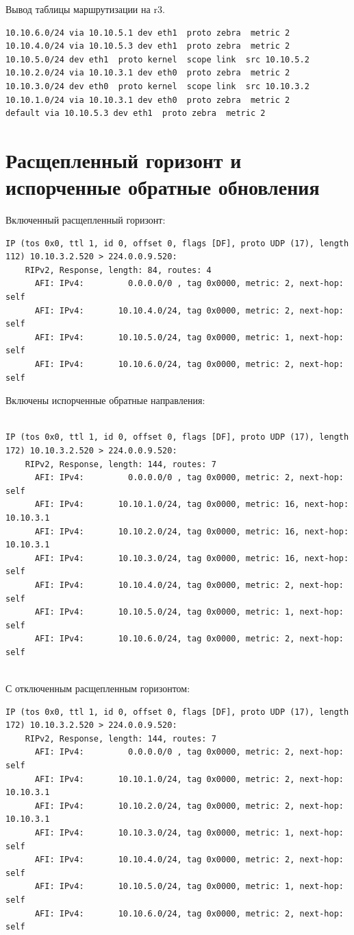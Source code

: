 \documentclass[a4paper,12pt]{article}
\begin{document}
Вывод таблицы маршрутизации на r3.

\begin{Verbatim}
10.10.6.0/24 via 10.10.5.1 dev eth1  proto zebra  metric 2 
10.10.4.0/24 via 10.10.5.3 dev eth1  proto zebra  metric 2 
10.10.5.0/24 dev eth1  proto kernel  scope link  src 10.10.5.2 
10.10.2.0/24 via 10.10.3.1 dev eth0  proto zebra  metric 2 
10.10.3.0/24 dev eth0  proto kernel  scope link  src 10.10.3.2 
10.10.1.0/24 via 10.10.3.1 dev eth0  proto zebra  metric 2 
default via 10.10.5.3 dev eth1  proto zebra  metric 2 
\end{Verbatim}

\section{Расщепленный горизонт и испорченные обратные обновления}

Включенный расщепленный горизонт:
\begin{Verbatim}
IP (tos 0x0, ttl 1, id 0, offset 0, flags [DF], proto UDP (17), length 112) 10.10.3.2.520 > 224.0.0.9.520: 
	RIPv2, Response, length: 84, routes: 4
	  AFI: IPv4:         0.0.0.0/0 , tag 0x0000, metric: 2, next-hop: self
	  AFI: IPv4:       10.10.4.0/24, tag 0x0000, metric: 2, next-hop: self
	  AFI: IPv4:       10.10.5.0/24, tag 0x0000, metric: 1, next-hop: self
	  AFI: IPv4:       10.10.6.0/24, tag 0x0000, metric: 2, next-hop: self
\end{Verbatim}


Включены испорченные обратные направления:
\begin{Verbatim}

IP (tos 0x0, ttl 1, id 0, offset 0, flags [DF], proto UDP (17), length 172) 10.10.3.2.520 > 224.0.0.9.520: 
	RIPv2, Response, length: 144, routes: 7
	  AFI: IPv4:         0.0.0.0/0 , tag 0x0000, metric: 2, next-hop: self
	  AFI: IPv4:       10.10.1.0/24, tag 0x0000, metric: 16, next-hop: 10.10.3.1
	  AFI: IPv4:       10.10.2.0/24, tag 0x0000, metric: 16, next-hop: 10.10.3.1
	  AFI: IPv4:       10.10.3.0/24, tag 0x0000, metric: 16, next-hop: self
	  AFI: IPv4:       10.10.4.0/24, tag 0x0000, metric: 2, next-hop: self
	  AFI: IPv4:       10.10.5.0/24, tag 0x0000, metric: 1, next-hop: self
	  AFI: IPv4:       10.10.6.0/24, tag 0x0000, metric: 2, next-hop: self
	  
\end{Verbatim}

С отключенным расщепленным горизонтом:
\begin{Verbatim}
IP (tos 0x0, ttl 1, id 0, offset 0, flags [DF], proto UDP (17), length 172) 10.10.3.2.520 > 224.0.0.9.520: 
	RIPv2, Response, length: 144, routes: 7
	  AFI: IPv4:         0.0.0.0/0 , tag 0x0000, metric: 2, next-hop: self
	  AFI: IPv4:       10.10.1.0/24, tag 0x0000, metric: 2, next-hop: 10.10.3.1
	  AFI: IPv4:       10.10.2.0/24, tag 0x0000, metric: 2, next-hop: 10.10.3.1
	  AFI: IPv4:       10.10.3.0/24, tag 0x0000, metric: 1, next-hop: self
	  AFI: IPv4:       10.10.4.0/24, tag 0x0000, metric: 2, next-hop: self
	  AFI: IPv4:       10.10.5.0/24, tag 0x0000, metric: 1, next-hop: self
	  AFI: IPv4:       10.10.6.0/24, tag 0x0000, metric: 2, next-hop: self	
\end{Verbatim}
\end{document}
